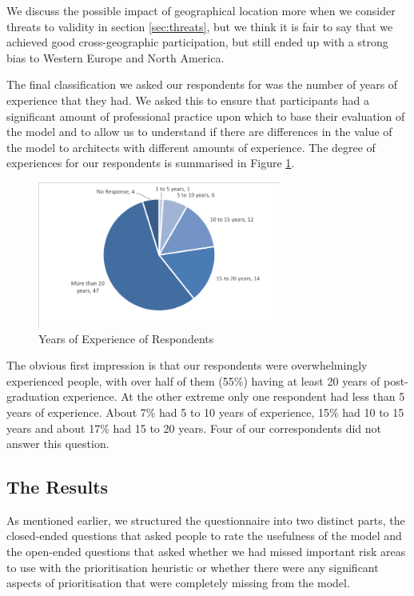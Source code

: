 We discuss the possible impact of geographical location more when we consider threats to validity in section \ref{sec:threats}, but we think it is fair to say that we achieved good cross-geographic participation, but still ended up with a strong bias to Western Europe and North America.

The final classification we asked our respondents for was the number of years of experience that they had.  We asked this to ensure that participants had a significant amount of professional practice upon which to base their evaluation of the model and to allow us to understand if there are differences in the value of the model to architects with different amounts of experience.  The degree of experiences for our respondents is summarised in Figure \ref{figure:yearsexp}.
 
\begin{figure}
\centering
\includegraphics[width=8cm,trim={2 2 2 2},clip]{Figures/prioritisation-yearsexp-detailed}
\caption{Years of Experience of Respondents}
\label{figure:yearsexp}
\end{figure}

The obvious first impression is that our respondents were overwhelmingly experienced people, with over half of them (55\%) having at least 20 years of post-graduation experience.  At the other extreme only one respondent had less than 5 years of experience.  About 7\% had 5 to 10 years of experience, 15\% had 10 to 15 years and about 17\% had 15 to 20 years.  Four of our correspondents did not answer this question.

\subsection{The Results}

As mentioned earlier, we structured the questionnaire into two distinct parts, the closed-ended questions that asked people to rate the usefulness of the model and the open-ended questions that asked whether we had missed important risk areas to use with the prioritisation heuristic or whether there were any significant aspects of prioritisation that were completely missing from the model.

